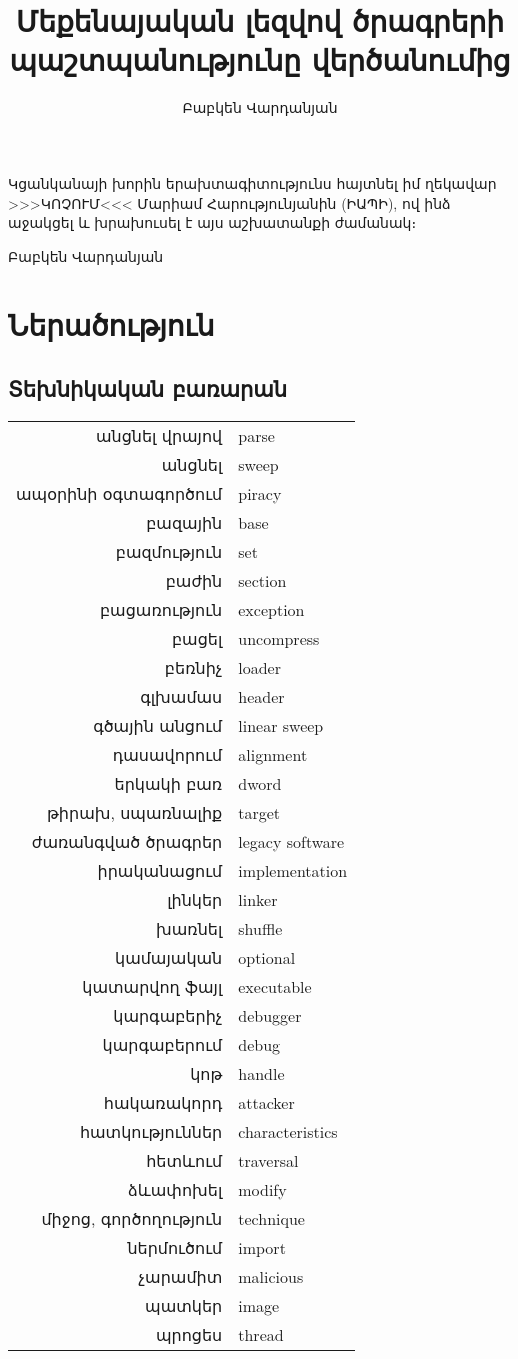 \documentclass[11pt]{article}
\author{Բաբկեն Վարդանյան}
\title{Մեքենայական լեզվով ծրագրերի պաշտպանությունը վերծանումից}
\begin{document}
\setcounter{page}{2}
Կցանկանայի խորին երախտագիտությունս հայտնել իմ ղեկավար >>>ԿՈՉՈՒՄ<<<
Մարիամ Հարությունյանին (ԻԱՊԻ), ով ինձ աջակցել և խրախուսել է այս աշխատանքի
ժամանակ։

\hfill \hfill Բաբկեն Վարդանյան

\newpage

\tableofcontents

\section{Ներածություն}
\begin{sloppypar}
\subsection{Տեխնիկական բառարան}

\begin{tabular}{rl}
անցնել վրայով&parse \\
անցնել&sweep \\
ապօրինի օգտագործում&piracy \\
բազային&base \\
բազմություն&set \\
բաժին&section \\
բացառություն&exception \\
բացել&uncompress \\
բեռնիչ&loader \\
գլխամաս&header \\
գծային անցում&linear sweep \\
դասավորում&alignment \\
երկակի բառ&dword \\
թիրախ, սպառնալիք&target \\
ժառանգված ծրագրեր&legacy software \\
իրականացում&implementation \\
լինկեր&linker \\
խառնել&shuffle \\
կամայական&optional \\
կատարվող ֆայլ&executable \\
կարգաբերիչ&debugger \\
կարգաբերում&debug \\
կոթ&handle \\
հակառակորդ&attacker \\
հատկություններ&characteristics \\
հետևում&traversal \\
ձևափոխել&modify \\
միջոց, գործողություն&technique \\
ներմուծում&import \\
չարամիտ&malicious \\
պատկեր&image \\
պրոցես&thread \\
\end{tabular}


\end{sloppypar}
\end{document}
